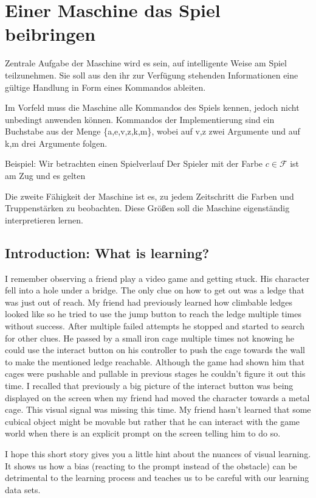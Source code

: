 \documentclass[12pt, letterpaper]{article}
\begin{document}
    

\section{Einer Maschine das Spiel beibringen}
Zentrale Aufgabe der Maschine wird es sein, auf intelligente Weise am Spiel teilzunehmen. Sie soll aus den ihr zur Verfügung stehenden Informationen eine gültige Handlung in Form eines Kommandos ableiten.

Im Vorfeld muss die Maschine alle Kommandos des Spiels kennen,
jedoch nicht unbedingt anwenden können. Kommandos der Implementierung sind ein Buchstabe aus der Menge \{a,e,v,z,k,m\}, wobei auf v,z zwei Argumente und auf k,m drei Argumente folgen.


Beispiel: Wir betrachten einen Spielverlauf Der Spieler mit der Farbe $c\in\mathcal{F}$ ist am Zug und es gelten 

Die zweite Fähigkeit der Maschine ist es, zu jedem Zeitschritt die Farben und Truppenstärken zu beobachten. Diese Größen soll die Maschine eigenständig interpretieren lernen.

\subsection{Introduction: What is learning?}
I remember observing a friend play a video game and getting stuck. His character fell into a hole under a bridge. The only clue on how to get out was a ledge that was just out of reach. My friend had previously learned how climbable ledges looked like so he tried to use the jump button to reach the ledge multiple times without success. After multiple failed attempts he stopped and started to search for other clues. He passed by a small iron cage multiple times not knowing he could use the interact button on his controller to push the cage towards the wall to make the mentioned ledge reachable. Although the game had shown him that cages were pushable and pullable in previous stages he couldn't figure it out this time. I recalled that previously a big picture of the interact button was being displayed on the screen when my friend had moved the character towards a metal cage. This visual signal was missing this time. My friend hasn't learned that some cubical object might be movable but rather that he can interact with the game world when there is an explicit prompt on the screen telling him to do so. 

I hope this short story gives you a little hint about the nuances of visual learning. It shows us how a bias (reacting to the prompt instead of the obstacle) can be detrimental to the learning process and teaches us to be careful with our learning data sets. \\
\end{document}
